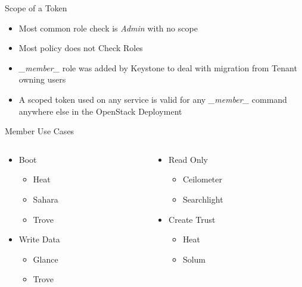 \documentclass{beamer}
\begin{document}
\begin{frame}{Scope of a Token}
  \begin{itemize}
  \item Most common role check is \textit{Admin} with no scope
  \item Most policy does not Check Roles
  \item  \textit{\_member\_ } role was added by Keystone to deal with migration from Tenant owning users
    \item A scoped token used on any service is valid for any \textit{\_member\_ } command anywhere else in the OpenStack Deployment
  \end{itemize}
\end{frame}


\begin{frame}{Member Use Cases}
  \begin{columns}[t,onlytextwidth]

    \begin{column}{.5\textwidth}
      \begin{itemize}
      \item Boot
        \begin{itemize}
        \item Heat
        \item Sahara
        \item Trove
        \end{itemize}
      \item Write Data
        \begin{itemize}
        \item Glance
        \item Trove
        \end{itemize}

      \end{itemize}
    \end{column}


    \begin{column}{.5\textwidth}
      \begin{itemize}
      \item Read Only
        \begin{itemize}
        \item Ceilometer
        \item Searchlight
        \end{itemize}

      \item Create Trust
        \begin{itemize}
        \item Heat
        \item Solum
        \end{itemize}
      \end{itemize}
    \end{column}
  \end{columns}
\end{frame}
\end{document}
